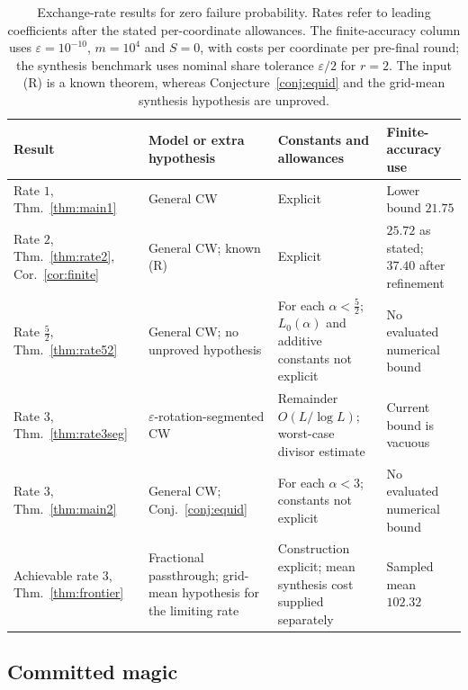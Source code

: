 \documentclass[aps,prx,twocolumn,superscriptaddress,nofootinbib,longbibliography]{revtex4-2}
\theoremstyle{plain}
\theoremstyle{definition}
\theoremstyle{remark}
\begin{document}
\begin{table}[t]
\centering\footnotesize
\caption{Exchange-rate results for zero failure probability. Rates refer to leading coefficients after the stated per-coordinate allowances. The finite-accuracy column uses $\varepsilon=10^{-10}$, $m=10^4$ and $S=0$, with costs per coordinate per pre-final round; the synthesis benchmark uses nominal share tolerance $\varepsilon/2$ for $r=2$. The input (R) is a known theorem, whereas Conjecture~\ref{conj:equid} and the grid-mean synthesis hypothesis are unproved.}
\label{tab:results}
\setlength{\tabcolsep}{3pt}\raggedright
\begin{tabular}{@{}p{}p{}p{}p{}@{}}
\toprule
\raggedright Result & \raggedright Model or extra hypothesis & \raggedright Constants and allowances & \raggedright Finite-accuracy use\tabularnewline
\midrule
\raggedright Rate $1$, Thm.~\ref{thm:main1} & \raggedright General CW & \raggedright Explicit & \raggedright Lower bound $21.75$\tabularnewline[3pt]
\raggedright Rate $2$, Thm.~\ref{thm:rate2}, Cor.~\ref{cor:finite} & \raggedright General CW; known (R) & \raggedright Explicit & \raggedright $25.72$ as stated; $37.40$ after refinement\tabularnewline[3pt]
\raggedright Rate $\tfrac52$, Thm.~\ref{thm:rate52} & \raggedright General CW; no unproved hypothesis & \raggedright For each $\alpha<\tfrac52$; $L_0(\alpha)$ and additive constants not explicit & \raggedright No evaluated numerical bound\tabularnewline[3pt]
\raggedright Rate $3$, Thm.~\ref{thm:rate3seg} & \raggedright $\varepsilon$-rotation-segmented CW & \raggedright Remainder $O(L/\log L)$; worst-case divisor estimate & \raggedright Current bound is vacuous\tabularnewline[3pt]
\raggedright Rate $3$, Thm.~\ref{thm:main2} & \raggedright General CW; Conj.~\ref{conj:equid} & \raggedright For each $\alpha<3$; constants not explicit & \raggedright No evaluated numerical bound\tabularnewline[3pt]
\raggedright Achievable rate $3$, Thm.~\ref{thm:frontier} & \raggedright Fractional passthrough; grid-mean hypothesis for the limiting rate & \raggedright Construction explicit; mean synthesis cost supplied separately & \raggedright Sampled mean $102.32$\tabularnewline
\bottomrule
\end{tabular}
\end{table}

\subsection{Committed magic}\label{sec:main1}
\end{document}
